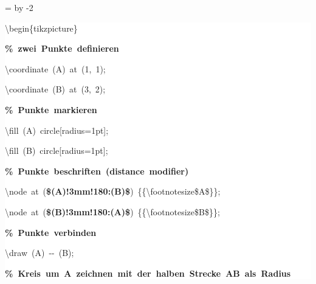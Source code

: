 \begingroup
\ttfamily
{}
=\textwidth
\advance{} by -2\fboxsep
\noindent
\colorbox{background}
{%
\parbox{\dimen255}
{%
\rule[-0.5ex]{0pt}{2.5ex}\hspace*{0.0em}\textbackslash{}begin\{tikzpicture\}\\
\rule[-0.5ex]{0pt}{2.5ex}\hspace*{1.0em}\textcolor{G}{\textbf{\%~zwei~Punkte~definieren}}\\
\rule[-0.5ex]{0pt}{2.5ex}\hspace*{1.0em}\textbackslash{}coordinate~(A)~at~(1,~1);\\
\rule[-0.5ex]{0pt}{2.5ex}\hspace*{1.0em}\textbackslash{}coordinate~(B)~at~(3,~2);\\
\rule[-0.5ex]{0pt}{2.5ex}\hspace*{1.0em}\textcolor{G}{\textbf{\%~Punkte~markieren}}\\
\rule[-0.5ex]{0pt}{2.5ex}\hspace*{1.0em}\textbackslash{}fill~(A)~circle[radius=1pt];\\
\rule[-0.5ex]{0pt}{2.5ex}\hspace*{1.0em}\textbackslash{}fill~(B)~circle[radius=1pt];\\
\rule[-0.5ex]{0pt}{2.5ex}\hspace*{1.0em}\textcolor{G}{\textbf{\%~Punkte~beschriften~(distance~modifier)}}\\
\rule[-0.5ex]{0pt}{2.5ex}\hspace*{1.0em}\textbackslash{}node~at~(\textcolor{R}{\textbf{\$(A)!3mm!180:(B)\$}})~\{\{\textbackslash{}footnotesize\$A\$\}\};\\
\rule[-0.5ex]{0pt}{2.5ex}\hspace*{1.0em}\textbackslash{}node~at~(\textcolor{R}{\textbf{\$(B)!3mm!180:(A)\$}})~\{\{\textbackslash{}footnotesize\$B\$\}\};\\
\rule[-0.5ex]{0pt}{2.5ex}\hspace*{1.0em}\textcolor{G}{\textbf{\%~Punkte~verbinden}}\\
\rule[-0.5ex]{0pt}{2.5ex}\hspace*{1.0em}\textbackslash{}draw~(A)~{-}{-}~(B);\\
\rule[-0.5ex]{0pt}{2.5ex}\hspace*{1.0em}\textcolor{G}{\textbf{\%~Kreis~um~A~zeichnen~mit~der~halben~Strecke~AB~als~Radius}}\\
}}
